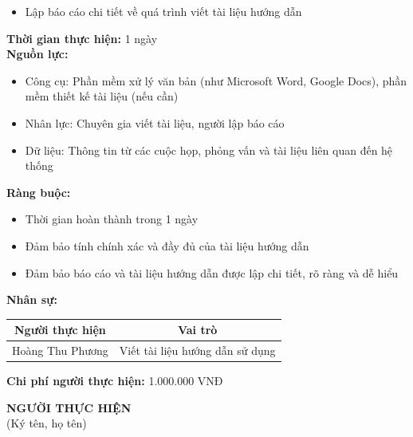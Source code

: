 {\begin{minipage}{\textwidth}
\begin{itemize}
        \item Lập báo cáo chi tiết về quá trình viết tài liệu hướng dẫn
    \end{itemize}
    \vspace{0.5cm}
    \noindent \textbf{Thời gian thực hiện:} 1 ngày \\
    \noindent \textbf{Nguồn lực:}
    \begin{itemize}
        \item Công cụ: Phần mềm xử lý văn bản (như Microsoft Word, Google Docs), phần mềm thiết kế tài liệu (nếu cần)
        \item Nhân lực: Chuyên gia viết tài liệu, người lập báo cáo
        \item Dữ liệu: Thông tin từ các cuộc họp, phỏng vấn và tài liệu liên quan đến hệ thống
    \end{itemize}
    \vspace{0.5cm}
    \noindent \textbf{Ràng buộc:}
    \begin{itemize}
        \item Thời gian hoàn thành trong 1 ngày
        \item Đảm bảo tính chính xác và đầy đủ của tài liệu hướng dẫn
        \item Đảm bảo báo cáo và tài liệu hướng dẫn được lập chi tiết, rõ ràng và dễ hiểu
    \end{itemize}
    \vspace{0.5cm}
    \noindent \textbf{Nhân sự:}
    \begin{longtable}{|c|c|}
    \hline
    \textbf{Người thực hiện} & \textbf{Vai trò} \\
    \hline
    Hoàng Thu Phương & Viết tài liệu hướng dẫn sử dụng \\
    \hline
    \end{longtable}
    \vspace{0.5cm}
    \noindent \textbf{Chi phí người thực hiện:} 1.000.000 VNĐ \\
    \vspace{1cm}
    \begin{flushleft}
        \hspace{8cm} \textbf{NGƯỜI THỰC HIỆN} \\
        \hspace{8.8cm} (Ký tên, họ tên) \\
        \vspace{1cm}
    \end{flushleft}
    \end{minipage}
}
% 
